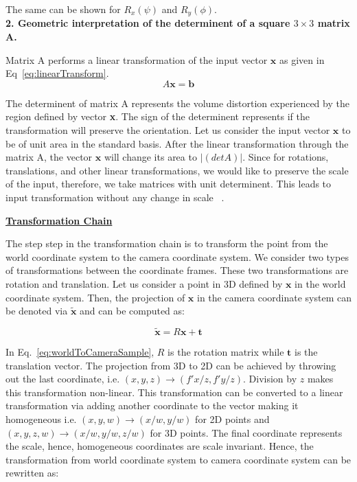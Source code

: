 \documentclass[a4paper, twoside, english]{article}
\begin{document}
The same can be shown for $R_x (\psi)$ and $R_y (\phi)$. \\

\textbf{2. Geometric interpretation of the determinent of a square $3\times3$ matrix A.}

Matrix A performs a linear transformation of the input vector $\textbf{x}$ as given in Eq~\ref{eq:linearTransform}. 
\begin{equation}
 A\textbf{x} = \textbf{b}
 \label{eq:linearTransform}
\end{equation}

The determinent of matrix A represents the volume distortion experienced by the region defined by vector \textbf{x}. The sign of the determinent represents if the transformation will preserve the orientation.
Let us consider the input vector $\textbf{x}$ to be of unit area in the standard basis. After the linear transformation through the matrix A, the vector $\textbf{x}$ will change its area to $|(det A)|$. 
Since for rotations, translations, and other linear transformations, we would like to preserve the scale of the input, therefore, we take matrices with unit determinent. This leads to input transformation without any change in scale ~\cite{determinent}.

\bigbreak
\underline{\textbf{Transformation Chain}}

The step step in the transformation chain is to transform the point from the world coordinate system to the camera coordinate system. We consider two types of transformations between the coordinate frames. These two transformations are rotation and translation.
Let us consider a point in 3D defined by $\textbf{x}$ in the world coordinate system. Then, the projection of $\textbf{x}$ in the camera coordinate system can be denoted via $\tilde{\textbf{x}}$ and can be computed as:

\begin{equation}
 \tilde{\textbf{x}} = R\textbf{x} + \textbf{t}
 \label{eq:worldToCameraSample}
\end{equation}

In Eq.~\ref{eq:worldToCameraSample}, $R$ is the rotation matrix while $\textbf{t}$ is the translation vector. The projection from 3D to 2D can be achieved by throwing out the last coordinate, i.e. $(x,y,z) \to (f'x/z, f'y/z)$. 
Division by $z$ makes this transformation non-linear. This transformation can be converted to a linear transformation via adding another coordinate to the vector making it homogeneous i.e. $(x,y,w) \to (x/w, y/w)$ for 2D points and $(x,y,z,w) \to (x/w, y/w, z/w)$ for 3D points. The final coordinate represents the scale, hence, homogeneous coordinates are scale invariant.
Hence, the transformation from world coordinate system to camera coordinate system can be rewritten as:
\end{document}
